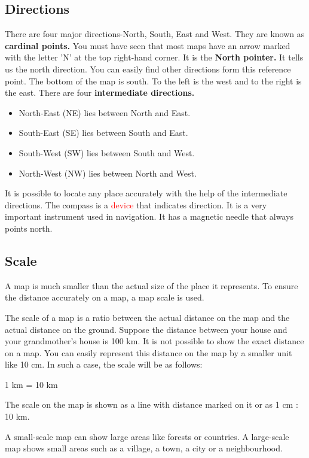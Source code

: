 \subsection{\textbf{Directions}}
There are four major directions-North, South, East and West. They are known as \textbf{cardinal points.} You must have seen that most maps have an arrow marked with the letter 'N' at the top right-hand corner. It is the \textbf{North pointer.} It tells us the north direction. You can easily find other directions form this reference point. The bottom of the map is south. To the left is the west and to the right is the east. There are four \textbf{intermediate directions.}
\begin{itemize}
    \item North-East (NE) lies between North and East.
    \item South-East (SE) lies between South and East.
    \item South-West (SW) lies between South and West.
    \item North-West (NW) lies between North and West.
\end{itemize}
It is possible to locate any place accurately with the help of the intermediate directions. The compass is a \textcolor{red}{device} that indicates direction. It is a very important instrument used in navigation. It has a magnetic needle that always points north.
\subsection{\textbf{Scale}}
A map is much smaller than the actual size of the place it represents. To ensure the distance accurately on a map, a map scale is used.
\vspace{0.1in}
\par
The scale of a map is a ratio between the actual distance on the map and the actual distance on the ground. Suppose the distance between your house and your grandmother's house is 100 km. It is not possible to show the exact distance on a map. You can easily represent this distance on the map by a smaller unit like 10 cm. In such a case, the scale will be as follows:
\vspace{0.1in}
\par
1 km = 10 km
\vspace{0.1in}
\par
The scale on the map is shown as a line with distance marked on it or as 1 cm : 10 km.
\vspace{0.1in}
\par
A small-scale map can show large areas like forests or countries. A large-scale map shows small areas such as a village, a town, a city or a neighbourhood.
